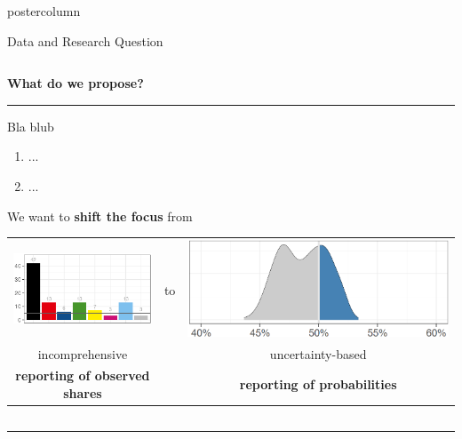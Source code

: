 \documentclass[final,hyperref={pdfpagelabels=false}]{beamer}
\newcommand{\bfBlue}[1]{\textcolor{koaladarkestblue}{\textbf{#1}}}
\newcommand{\colHeader}[1]{
  \vspace{-3ex}
  \begin{center}
  \bfBlue{#1}
  \end{center}
  \vspace{-2ex}
  \textcolor{koalablue}{\hrule{\linewidth}}
  \vspace{2ex}
}
\begin{document}
\begin{frame}
\begin{columns}
\begin{column}{1\textwidth}
\begin{beamercolorbox}[center,wd=\textwidth]{postercolumn}
\begin{minipage}[T]{.95\textwidth}
\begin{block}{\footnotesize Data and Research Question}
\begin{columns}[t]
  \begin{column}{.35\textwidth}
  \colHeader{What do we propose?}
   Bla blub
  \begin{enumerate}
    \item ...
    \item ...
  \end{enumerate}
  \begin{center}
  We want to \bfBlue{shift the focus} from \\[2ex]
  \begin{tabular}{ccc}
  \includegraphics[height=10ex]{figures/motivation_bars}
  &
  to
  &
  \includegraphics[height=10ex]{figures/motivation_density}
  \\
  incomprehensive & & uncertainty-based \\
  \bfBlue{reporting of observed shares} & & \bfBlue{reporting of probabilities} \\
  \end{tabular}
  \end{center}
  \vspace{1ex}
  \end{column}

  \end{columns}

  \vspace{2ex}
  \textcolor{LMUlightgray}{\hrule{\linewidth}}
  \vspace{2ex}

  \begin{columns}[t]


\end{columns}
\end{block}
\end{minipage}
\end{beamercolorbox}
\end{column}
\end{columns}
\end{frame}
\end{document}
